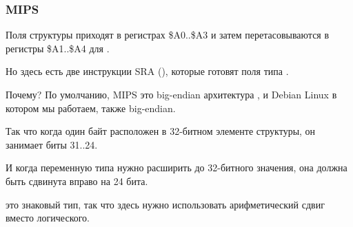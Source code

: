 \subsubsection{MIPS}
\label{MIPS_structure_big_endian}



Поля структуры приходят в регистрах \$A0..\$A3 и затем перетасовываются в регистры \$A1..\$A4 для \printf.

Но здесь есть две инструкции SRA (), которые готовят поля типа \Tchar.

Почему?
По умолчанию, MIPS это big-endian архитектура , и Debian Linux в котором мы работаем, также big-endian.

Так что когда один байт расположен в 32-битном элементе структуры, он занимает биты 31..24.

И когда переменную типа \Tchar нужно расширить до 32-битного значения, она должна быть сдвинута вправо
на 24 бита.

\Tchar это знаковый тип, так что здесь нужно использовать арифметический сдвиг вместо логического.


